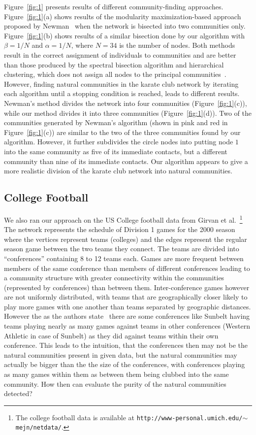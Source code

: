\documentclass{sig-alternate}
\newcommand{\figref}[1]{Figure~\ref{#1}}
\begin{document}
\figref{fig:1} presents results of different community-finding approaches. \figref{fig:1}(a) shows results of the  modularity maximization-based approach proposed by Newman~\cite{Newman204}  when the network is bisected into two communities only. \figref{fig:1}(b) shows results of a similar bisection done by our algorithm with $\beta= 1/N $ and $\alpha=1/N$, where $N=34$ is the number of nodes. Both methods result in the correct assignment of individuals to communities and are better than those produced by the spectral bisection algorithm and hierarchical clustering, which does not assign all nodes to the principal communities~\cite{Newman206}.
However, finding natural communities in the karate club network by iterating each algorithm until a stopping condition is reached, leads to different results. Newman's method divides the network into four communities (\figref{fig:1}(c)), while our method divides it into three communities (\figref{fig:1}(d)). Two of the communities generated by Newman's algorithm (shown in pink and red in \figref{fig:1}(c))  are similar to the two of the three communities found by our algorithm. However, it further subdivides the circle nodes into 
putting node $1$ into the same community as five of its immediate contacts, but a different community than nine of its immediate contacts.
Our algorithm appears to give a more realistic division of the karate club network into natural communities.


\subsection{College Football}

We also ran our approach on the US College football data from Girvan et al.~\cite{GirvanNewman02}\footnote{The college football data is available at \texttt{http://www-personal.umich.edu/$\sim$mejn/netdata/}.} The network represents the schedule of Division 1 games for the 2000 season where the vertices represent teams (colleges) and the edges represent the regular season game between the two teams they connect. The teams are divided into ``conferences'' containing 8 to 12 teams each. Games are more frequent between members of the same conference than members of different conferences leading to a  community structure with greater connectivity within the communities (represented by conferences) than between them. Inter-conference games however are not uniformly distributed, with teams that are geographically closer likely to play more games with one another than teams separated by geographic distances. However the as the authors state~\cite{GirvanNewman02} there are some conferences  like Sunbelt having teams playing nearly as many games against teams in other conferences (Western Athletic in case of Sunbelt) as they did against teams within their own conference. This leads to the intuition, that the conferences then may not be the natural communities present in given data, but the natural communities may actually be bigger than the the size of the conferences, with conferences playing as many games within them as between them being clubbed into the same community. How then can evaluate the purity of the natural communities detected?
\end{document}
